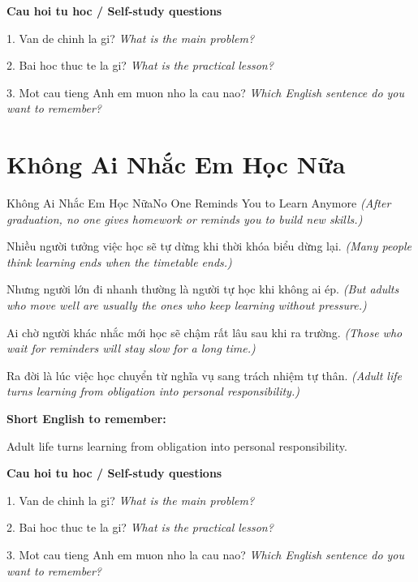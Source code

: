 \begin{tuhocnhanh}
\textbf{Cau hoi tu hoc / Self-study questions}

1. Van de chinh la gi? \textit{What is the main problem?}

2. Bai hoc thuc te la gi? \textit{What is the practical lesson?}

3. Mot cau tieng Anh em muon nho la cau nao? \textit{Which English sentence do you want to remember?}
\end{tuhocnhanh}
\ngancach

\section{Không Ai Nhắc Em Học Nữa}
\begin{truyen}{Không Ai Nhắc Em Học Nữa}{No One Reminds You to Learn Anymore}
\textit{(After graduation, no one gives homework or reminds you to build new skills.)}

Nhiều người tưởng việc học sẽ tự dừng khi thời khóa biểu dừng lại.
\textit{(Many people think learning ends when the timetable ends.)}

Nhưng người lớn đi nhanh thường là người tự học khi không ai ép.
\textit{(But adults who move well are usually the ones who keep learning without pressure.)}

Ai chờ người khác nhắc mới học sẽ chậm rất lâu sau khi ra trường.
\textit{(Those who wait for reminders will stay slow for a long time.)}

\end{truyen}

\begin{baihoc}
Ra đời là lúc việc học chuyển từ nghĩa vụ sang trách nhiệm tự thân.
\textit{(Adult life turns learning from obligation into personal responsibility.)}
\end{baihoc}

\begin{ghinhoanh}
\textbf{Short English to remember:}

Adult life turns learning from obligation into personal responsibility.

\end{ghinhoanh}

\begin{tuhocnhanh}
\textbf{Cau hoi tu hoc / Self-study questions}

1. Van de chinh la gi? \textit{What is the main problem?}

2. Bai hoc thuc te la gi? \textit{What is the practical lesson?}

3. Mot cau tieng Anh em muon nho la cau nao? \textit{Which English sentence do you want to remember?}
\end{tuhocnhanh}
\ngancach

